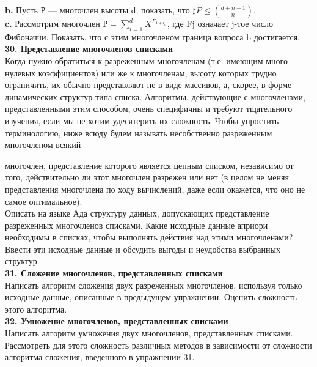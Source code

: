 \textbf{b.} Пусть Р — многочлен высоты d; показать, что $\sharp P \leqslant (\frac{d+n-1}{n})$.\\

\textbf{c.} Рассмотрим многочлен $Р = \sum^{d}_{i=1} X^{F_{1+i_{n}}}$, где Fj означает j-тое число Фибоначчи. Показать, что с этим многочленом граница вопроса b достигается.\\

\noindent
\textbf{30. Представление многочленов списками}\\

Когда нужно обратиться к разреженным многочленам (т.е. имеющим много нулевых коэффициентов) или же к многочленам, высоту которых трудно ограничить, их обычно представляют не в виде массивов, а, скорее, в форме динамических структур типа списка. Алгоритмы, действующие с многочленами, представленными этим способом, очень специфичны и требуют тщательного изучения, если мы не хотим удесятерить их сложность. Чтобы упростить терминологию, ниже всюду будем называть несобственно разреженным многочленом всякий

\newpage

\noindent
многочлен, представление которого является цепным списком, независимо от того, действительно ли этот многочлен разрежен или нет (в целом не меняя представления многочлена по ходу вычислений, даже если окажется, что оно не самое оптимальное).\\

Описать на языке Ада структуру данных, допускающих представление разреженных многочленов списками. Какие исходные данные априори необходимы в списках, чтобы выполнять действия над этими многочленами? Ввести эти исходные данные и обсудить выгоды и неудобства выбранных структур.\\

\noindent
\textbf{31. Сложение многочленов, представленных списками}\\

\noindent
Написать алгоритм сложения двух разреженных многочленов, используя только исходные данные, описанные в предыдущем упражнении. Оценить сложность этого алгоритма.\\

\noindent
\textbf{32. Умножение многочленов, представленных списками}\\

Написать алгоритм умножения двух многочленов, представленных списками. Рассмотреть для этого сложность различных методов в зависимости от сложности алгоритма сложения, введенного в упражнении 31.\\

